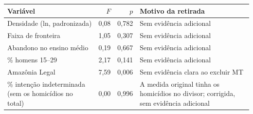 \begin{tabular}{@{}p{}rrp{}@{}}
\toprule
\textbf{Variável} & \textbf{$F$} & \textbf{$p$} & \textbf{Motivo da retirada}\\
\midrule
Densidade (ln, padronizada) & 0,08 & 0,782 & Sem evidência adicional\\
Faixa de fronteira & 1,05 & 0,307 & Sem evidência adicional\\
Abandono no ensino médio & 0,19 & 0,667 & Sem evidência adicional\\
\% homens 15--29 & 2,17 & 0,141 & Sem evidência adicional\\
Amazônia Legal & 7,59 & 0,006 & Sem evidência clara ao excluir MT\\
\% intenção indeterminada (sem os homicídios no total) & 0,00 & 0,996 & A medida original tinha os homicídios no divisor; corrigida, sem evidência adicional\\
\bottomrule
\end{tabular}
